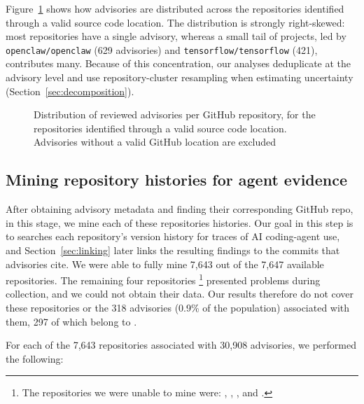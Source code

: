 \documentclass[smallextended,natbib]{svjour3}
\newcommand{\tool}[1]{\texttt{#1}}
\begin{document}
Figure~\ref{fig:population-per-repo} shows how advisories are distributed
across the repositories identified through a valid source code location.
The distribution is strongly right-skewed: most repositories have a single
advisory, whereas a small tail of projects, led by \tool{openclaw/openclaw}
(629 advisories) and \tool{tensorflow/tensorflow} (421), contributes many.
Because of this concentration, our analyses deduplicate at the advisory level
and use repository-cluster resampling when estimating uncertainty
(Section~\ref{sec:decomposition}).

\begin{figure}[!ht]
\centering

\caption{Distribution of reviewed advisories per GitHub repository, for the
repositories identified through a valid source code location. Advisories
without a valid GitHub location are excluded}
\label{fig:population-per-repo}
\end{figure}

\subsection{Mining repository histories for agent evidence}
\label{sec:evidence-search}

\begingroup\sloppy
After obtaining advisory metadata and finding their corresponding GitHub repo, in this stage, we mine each of these repositories histories.  Our goal in this step is to searches each
repository's version history for traces of AI coding-agent use, and
Section~\ref{sec:linking} later links the resulting findings to the commits
that advisories cite.  We were able to fully mine 7,643 out of the 7,647 available repositories. The remaining four repositories \footnote{The repositories we were unable to mine were: ,
, , and
.} presented problems during collection, and
we could not obtain their data.  Our results therefore do not cover these
repositories or the 318 advisories (0.9\% of the population) associated with
them, 297 of which belong to .

For each of the 7,643 repositories associated with 30,908 advisories, we performed the following:\par\endgroup
\end{document}
